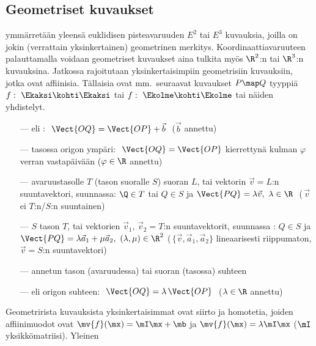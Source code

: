 \subsection*{Geometriset kuvaukset}

 ymmärretään yleensä euklidisen pisteavaruuden $E^2$ tai $E^3$
kuvauksia, joilla on jokin (verrattain yksinkertainen) geometrinen merkitys. 
Koordinaattiavaruuteen palauttamalla voidaan geometriset kuvaukset aina tulkita myös $\R^2$:n 
tai $\R^3$:n kuvauksina. Jatkossa rajoitutaan yksinkertaisimpiin geometrisiin kuvauksiin,
jotka ovat affiinisia. Tällaisia ovat mm.\ seuraavat kuvaukset $P \map Q$ tyyppiä 
$f:\ \Ekaksi\kohti\Ekaksi$ tai $f:\ \Ekolme\kohti\Ekolme$ tai näiden yhdistelyt.
  
  
\begin{itemize}
\item[---]  eli : $\ \Vect{OQ} = \Vect{OP} + \vec{b}\ $ 
           ($\vec{b}$ annettu)
\item[---]  tasossa origon ympäri: $\ \Vect{OQ} = \Vect{OP}$ kierrettynä kulman 
            $\varphi$ verran vastapäivään ($\varphi \in \R$ annettu)
\item[---]  avaruustasolle $T$ (tason suoralle $S$) suoran $L$,
           tai vektorin $\vec v=L$:n suuntavektori, suunnassa: $\Q \in T$ tai $Q \in S$ ja
           $\Vect{PQ}=\lambda\vec v,\ \lambda\in\R\ $ ($\,\vec v\,$ ei $T$:n/$S$:n suuntainen)
\item[---]  $S$ tason $T$, tai vektorien
           $\vec v_1,\,\vec v_2=T$:n suuntavektorit, suunnassa : $Q \in S$ ja 
           $\Vect{PQ}=\lambda\vec{a}_1 + \mu\vec{a}_2,\ (\lambda,\mu)\in\R^2$
           ($\,\{\vec v,\vec{a}_1,\vec{a}_2\}$ lineaarisesti riippumaton, $\vec v=S$:n
           suuntavektori)
\item[---]  annetun tason (avaruudessa) tai suoran (tasossa) suhteen
\item[---]  eli  origon suhteen: 
           $\ \Vect{OQ} = \lambda\,\Vect{OP}\ $ ($\lambda \in \R$ annettu)
\end{itemize}
Geometrirista kuvauksista yksinkertaisimmat ovat siirto ja homotetia, joiden affiinimuodot ovat 
$\mv{f}(\mx) = \mI\mx + \mb$ ja $\mv{f}(\mx)=\lambda\mI\mx$ ($\mI$ yksikkömatriisi). Yleinen
